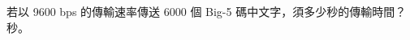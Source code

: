 \ifx\ntpcNinetyThree\undefined[93學年基北區] \fi
\label{ntpc-93-p40} 若以 9600 bps 的傳輸速率傳送 6000 個 Big-5 碼中文字，須多少秒的傳輸時間？ \underlineblank{\ref{ntpc-93-p40}} 秒。